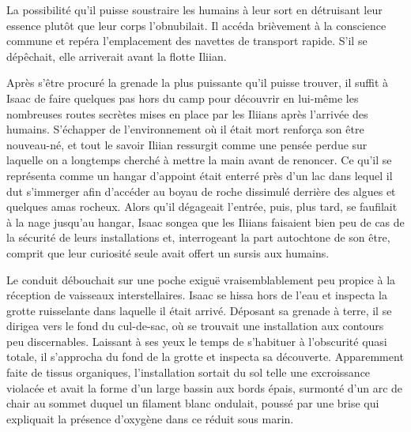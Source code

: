 \documentclass[12pt]{book}
\begin{document}
La possibilité qu'il puisse soustraire les humains à leur sort en détruisant leur essence plutôt que leur corps l'obnubilait. Il accéda brièvement à la conscience commune et repéra l'emplacement des navettes de transport rapide. S'il se dépêchait, elle arriverait avant la flotte Iliian.


Après s'être procuré la grenade la plus puissante qu'il puisse trouver, il suffit à Isaac de faire quelques pas hors du camp pour découvrir en lui-même les nombreuses routes secrètes mises en place par les Iliians après l’arrivée des humains. S'échapper de l'environnement où il était mort renforça son être nouveau-né, et tout le savoir Iliian ressurgit comme une pensée perdue sur laquelle on a longtemps cherché à mettre la main avant de renoncer. Ce qu'il se représenta comme un hangar d'appoint était enterré près d'un lac dans lequel il dut s'immerger afin d'accéder au boyau de roche dissimulé derrière des algues et quelques amas rocheux. Alors qu'il dégageait l'entrée, puis, plus tard, se faufilait à la nage jusqu'au hangar, Isaac songea que les Iliians faisaient bien peu de cas de la sécurité de leurs installations et, interrogeant la part autochtone de son être, comprit que leur curiosité seule avait offert un sursis aux humains.


Le conduit débouchait sur une poche exiguë vraisemblablement peu propice à la réception de vaisseaux interstellaires. Isaac se hissa hors de l'eau et inspecta la grotte ruisselante dans laquelle il était arrivé. Déposant sa grenade à terre, il se dirigea vers le fond du cul-de-sac, où se trouvait une installation aux contours peu discernables. Laissant à ses yeux le temps de s'habituer à l'obscurité quasi totale, il s'approcha du fond de la grotte et inspecta sa découverte. Apparemment faite de tissus organiques, l'installation sortait du sol telle une excroissance violacée et avait la forme d'un large bassin aux bords épais, surmonté d'un arc de chair au sommet duquel un filament blanc ondulait, poussé par une brise qui expliquait la présence d'oxygène dans ce réduit sous marin.
\end{document}
